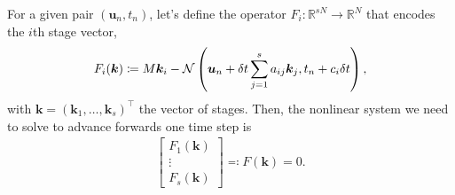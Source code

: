 \documentclass[review]{siamart}
\begin{document}
For a given pair $(\bm{u}_n,t_n)$, let's define the operator $F_i \colon \mathbb{R}^{sN} \to \mathbb{R}^N$ that encodes the $i$th stage vector,
\begin{align}
F_i(\bm{k}) \coloneqq M \bm{k}_i - {\cal N} \left(\bm{u}_n + \delta t \sum \limits_{j = 1}^s a_{ij} \bm{k}_j, t_n + c_i  \delta t \right),
\end{align}
with $\bm{k} = (\bm{k}_1, \ldots, \bm{k}_s)^\top$ the vector of stages. Then, the nonlinear system we need to solve to advance forwards one time step is
\begin{align}
\begin{bmatrix}
F_{1}(\bm{k})\\
\vdots \\
F_{s}(\bm{k})
\end{bmatrix}
\eqqcolon F(\bm{k}) = 0.
\end{align}
%
%
\end{document}
